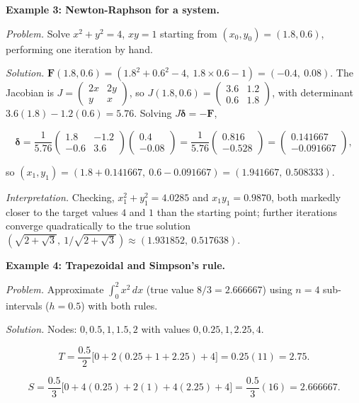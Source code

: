 \documentclass[
]{article}
\begin{document}
\textbf{Example 3: Newton-Raphson for a system.}

\emph{Problem.} Solve \(x^2+y^2=4\), \(xy=1\) starting from
\((x_0,y_0)=(1.8,0.6)\), performing one iteration by hand.

\emph{Solution.}
\(\mathbf F(1.8,0.6) = (1.8^2+0.6^2-4,\ 1.8\times0.6-1) =
(-0.4,\ 0.08)\). The Jacobian is
\(J = \begin{pmatrix}2x&2y\\y&x\end{pmatrix}\), so
\(J(1.8,0.6)=\begin{pmatrix}3.6&1.2\\0.6&1.8\end{pmatrix}\), with
determinant \(3.6(1.8)-1.2(0.6)=5.76\). Solving
\(J\boldsymbol\delta=-\mathbf F\),

\[
\boldsymbol\delta = \frac{1}{5.76}\begin{pmatrix}1.8&-1.2\\-0.6&3.6\end{pmatrix}
\begin{pmatrix}0.4\\-0.08\end{pmatrix}
= \frac{1}{5.76}\begin{pmatrix}0.816\\-0.528\end{pmatrix}
= \begin{pmatrix}0.141667\\-0.091667\end{pmatrix},
\]

so
\((x_1,y_1) = (1.8+0.141667,\ 0.6-0.091667) = (1.941667,\ 0.508333)\).

\emph{Interpretation.} Checking, \(x_1^2+y_1^2=4.0285\) and
\(x_1y_1=0.9870\), both markedly closer to the target values \(4\) and
\(1\) than the starting point; further iterations converge quadratically
to the true solution
\((\sqrt{2+\sqrt3},\ 1/\sqrt{2+\sqrt3}) \approx (1.931852,\
0.517638)\).

\textbf{Example 4: Trapezoidal and Simpson's rule.}

\emph{Problem.} Approximate \(\int_0^2 x^2\,dx\) (true value
\(8/3=2.666667\)) using \(n=4\) sub-intervals (\(h=0.5\)) with both
rules.

\emph{Solution.} Nodes: \(0, 0.5, 1, 1.5, 2\) with values
\(0, 0.25, 1, 2.25,
4\).

\[
T = \frac{0.5}{2}\bigl[0+2(0.25+1+2.25)+4\bigr] = 0.25(11) = 2.75.
\]

\[
S = \frac{0.5}{3}\bigl[0+4(0.25)+2(1)+4(2.25)+4\bigr]
= \frac{0.5}{3}(16) = 2.666667.
\]
\end{document}
